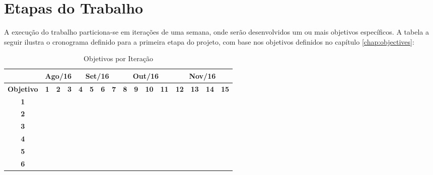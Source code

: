 \chapter{\label{chap:work-plan}Etapas do Trabalho}

A execução do trabalho particiona-se em iterações de uma semana, onde serão
desenvolvidos um ou mais objetivos específicos. A tabela a seguir ilustra o
cronograma definido para a primeira etapa do projeto, com base nos objetivos
definidos no capítulo \ref{chap:objectives}:

\begin{table}[htb!]
\centering
\caption{Objetivos por Iteração}
\label{tab:work-plan}
\begin{tabular}{c|c|c|c|c|c|c|c|c|c|c|c|c|c|c|c|}
\cline{2-16}
{\bf}                                 & \multicolumn{3}{c|}{{\bf Ago/16}} & \multicolumn{4}{c|}{{\bf Set/16}}     & \multicolumn{4}{c|}{{\bf Out/16}}      & \multicolumn{4}{c|}{{\bf Nov/16}}     \\ \hline
\multicolumn{1}{|c|}{{\bf Objetivo}}  & {\bf 1} & {\bf 2} & {\bf 3}	      & {\bf 4} & {\bf 5} & {\bf 6} & {\bf 7} & {\bf 8} & {\bf 9} & {\bf 10} & \bf{11} & \bf{12} & \bf{13} & \bf{14} & \bf{15} \\ \hline
\multicolumn{1}{|c|}{{\bf 1}}         &         &         &               &         &         &         &         &         &         &          &         &         &         &         &         \\ \hline
\multicolumn{1}{|c|}{{\bf 2}}         &         &         &               &         &         &         &         &         &         &          &         &         &         &         &         \\ \hline
\multicolumn{1}{|c|}{{\bf 3}}         &         &         &               &         &         &         &         &         &         &          &         &         &         &         &         \\ \hline
\multicolumn{1}{|c|}{{\bf 4}}         &         &         &               &         &         &         &         &         &         &          &         &         &         &         &         \\ \hline
\multicolumn{1}{|c|}{{\bf 5}}         &         &         &               &         &         &         &         &         &         &          &         &         &         &         &         \\ \hline
\multicolumn{1}{|c|}{{\bf 6}}         &         &         &               &         &         &         &         &         &         &          &         &         &         &         &         \\ \hline
\end{tabular}
\end{table}

